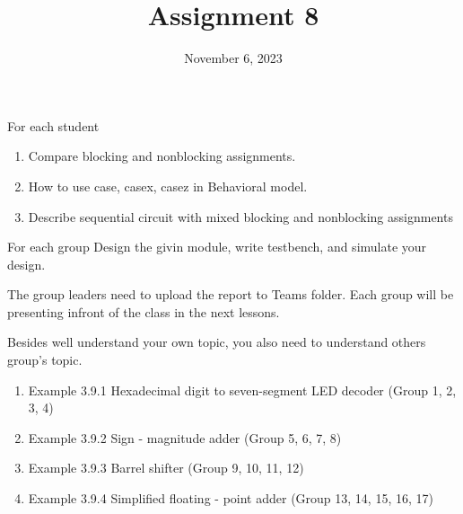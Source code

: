 \documentclass{vhdl-assignment}
\title{Assignment 8}
\date{November 6, 2023}
\begin{document}
\maketitle
\thispagestyle{fancy}

\begin{problem}{For each student}
    \begin{enumerate}
        \item Compare blocking and nonblocking assignments.
        \item How to use case, casex, casez in Behavioral model.
        \item Describe sequential circuit with mixed blocking and nonblocking assignments
    \end{enumerate}

\end{problem}

\begin{problem}{For each group}
    Design the givin module, write testbench, and simulate your design.

    The group leaders need to upload the report to Teams folder. Each group will be presenting infront of the class in the next lessons.

    Besides well understand your own topic, you also need to understand others group's topic.
    
    \begin{enumerate}
        \item Example 3.9.1 Hexadecimal digit to seven-segment LED decoder (Group 1, 2, 3, 4)
        \item Example 3.9.2 Sign - magnitude adder (Group 5, 6, 7, 8)
        \item Example 3.9.3 Barrel shifter (Group 9, 10, 11, 12)
        \item Example 3.9.4 Simplified floating - point adder (Group 13, 14, 15, 16, 17)
    \end{enumerate}


\end{problem}
\end{document}
